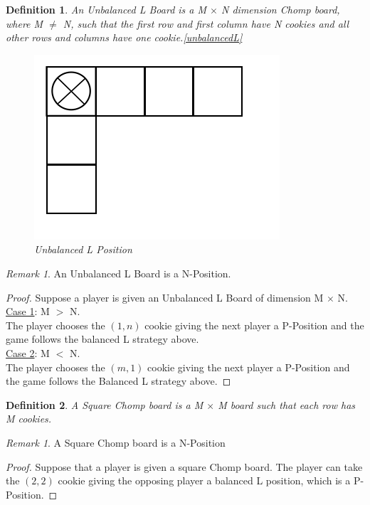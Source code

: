 \documentclass{amsart}
\newtheorem{term}{Definition} %
\theoremstyle{definition}
\theoremstyle{remark}
\newtheorem{rem}[thm]{Remark}
\numberwithin{equation}{section}
\begin{document}
\begin{term}
An Unbalanced L Board is a M $\times$ N dimension Chomp board, where M $\neq$ N, such that the first row and first column have N cookies and all other rows and columns have one cookie.\ref{unbalancedL} 
\begin{figure}[unbalancedL]
\includegraphics[scale=0.25]{Images/unbalancedL.png}
\caption{Unbalanced L Position}
\end{figure}
\end{term}

\begin{rem}
An Unbalanced L Board is a N-Position.
\end{rem}
\begin{proof}
Suppose a player is given an Unbalanced L Board of dimension M $\times$ N.\\
\underline{Case 1}: M $>$ N. \\
The player chooses the $(1,n)$ cookie giving the next player a P-Position and the game follows the balanced L strategy above.\\
\underline{Case 2}: M $<$ N.\\
The player chooses the $(m,1)$ cookie giving the next player a P-Position and the game follows the Balanced L strategy above.
\end{proof}

\begin{term}
A Square Chomp board is a M $\times$ M board such that each row has M cookies. 
\end{term}

\begin{rem}
A Square Chomp board is a N-Position
\end{rem}
\begin{proof}
Suppose that a player is given a square Chomp board. The player can take the $(2,2)$ cookie giving the opposing player a balanced L position, which is a P-Position.
\end{proof}
\end{document}

